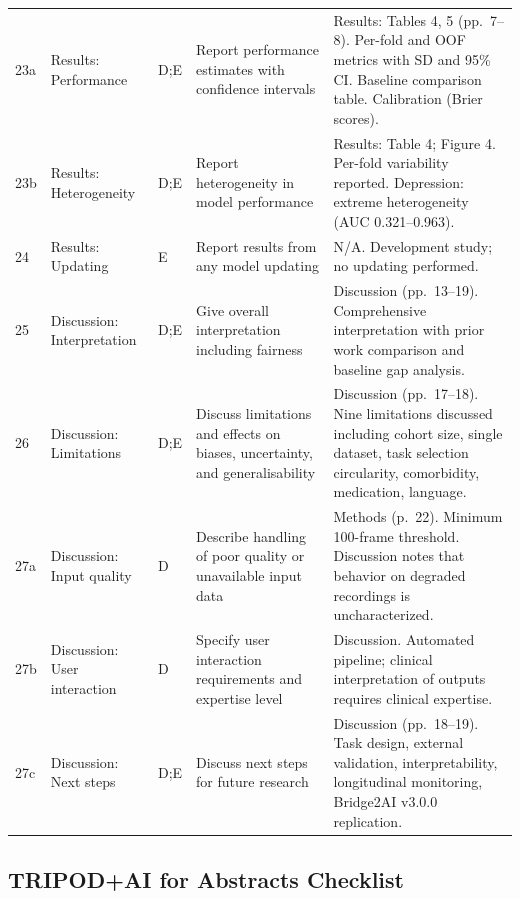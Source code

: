\documentclass[11pt,a4paper]{article}
\begin{document}
{\begin{longtable}{C{0.6cm} L{2.2cm} C{0.6cm} L{5.5cm} L{4.5cm}}
23a & Results: Performance & D;E & Report performance estimates with confidence intervals & Results: Tables 4, 5 (pp.~7--8). Per-fold and OOF metrics with SD and 95\% CI. Baseline comparison table. Calibration (Brier scores). \\
\addlinespace

23b & Results: Heterogeneity & D;E & Report heterogeneity in model performance & Results: Table 4; Figure 4. Per-fold variability reported. Depression: extreme heterogeneity (AUC 0.321--0.963). \\
\addlinespace

24 & Results: Updating & E & Report results from any model updating & N/A. Development study; no updating performed. \\
\addlinespace

25 & Discussion: Interpretation & D;E & Give overall interpretation including fairness & Discussion (pp.~13--19). Comprehensive interpretation with prior work comparison and baseline gap analysis. \\
\addlinespace

26 & Discussion: Limitations & D;E & Discuss limitations and effects on biases, uncertainty, and generalisability & Discussion (pp.~17--18). Nine limitations discussed including cohort size, single dataset, task selection circularity, comorbidity, medication, language. \\
\addlinespace

27a & Discussion: Input quality & D & Describe handling of poor quality or unavailable input data & Methods (p.~22). Minimum 100-frame threshold. Discussion notes that behavior on degraded recordings is uncharacterized. \\
\addlinespace

27b & Discussion: User interaction & D & Specify user interaction requirements and expertise level & Discussion. Automated pipeline; clinical interpretation of outputs requires clinical expertise. \\
\addlinespace

27c & Discussion: Next steps & D;E & Discuss next steps for future research & Discussion (pp.~18--19). Task design, external validation, interpretability, longitudinal monitoring, Bridge2AI v3.0.0 replication. \\

\end{longtable}
}

\subsection{TRIPOD+AI for Abstracts Checklist}
\label{sec:abstract_checklist}
\end{document}
